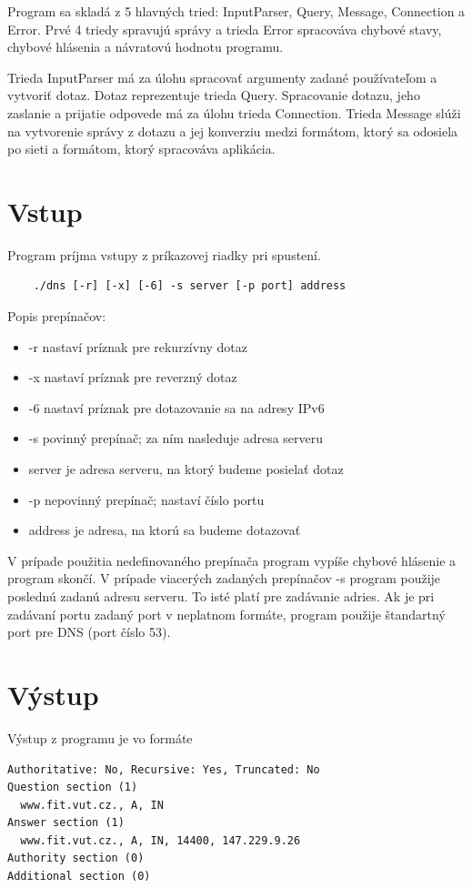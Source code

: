 Program sa skladá z 5 hlavných tried: InputParser, Query, Message, Connection a Error. Prvé 4 triedy spravujú správy a trieda Error spracováva chybové stavy, chybové hlásenia a návratovú hodnotu programu.

Trieda InputParser má za úlohu spracovať argumenty zadané používateľom a vytvoriť dotaz. Dotaz reprezentuje trieda Query.
Spracovanie dotazu, jeho zaslanie a prijatie odpovede má za úlohu trieda Connection. Trieda Message slúži na vytvorenie správy z dotazu a jej konverziu medzi 
formátom, ktorý sa odosiela po sieti a formátom, ktorý spracováva aplikácia.



\section{Vstup}
\label{Vstup}

Program príjma vstupy z príkazovej riadky pri spustení. 
\begin{verbatim}
    ./dns [-r] [-x] [-6] -s server [-p port] address
\end{verbatim}
    
Popis prepínačov:
\begin{itemize}
    \item -r nastaví príznak pre rekurzívny dotaz
    \item -x nastaví príznak pre reverzný dotaz 
    \item -6 nastaví príznak pre dotazovanie sa na adresy IPv6 
    \item -s povinný prepínač; za ním nasleduje adresa serveru
    \item server je adresa serveru, na ktorý budeme posielať dotaz
    \item -p nepovinný prepínač; nastaví číslo portu
    \item address je adresa, na ktorú sa budeme dotazovať
\end{itemize} 

V prípade použitia nedefinovaného prepínača program vypíše chybové hlásenie a program skončí. 
V prípade viacerých zadaných prepínačov -s program použije poslednú zadanú adresu serveru. To isté platí pre zadávanie adries.
Ak je pri zadávaní portu zadaný port v neplatnom formáte, program použije štandartný port pre DNS (port číslo 53).

\section{Výstup}
\label{Výstup}
Výstup z programu je vo formáte
\begin{verbatim}
Authoritative: No, Recursive: Yes, Truncated: No
Question section (1)
  www.fit.vut.cz., A, IN
Answer section (1)
  www.fit.vut.cz., A, IN, 14400, 147.229.9.26
Authority section (0)
Additional section (0)
\end{verbatim}

